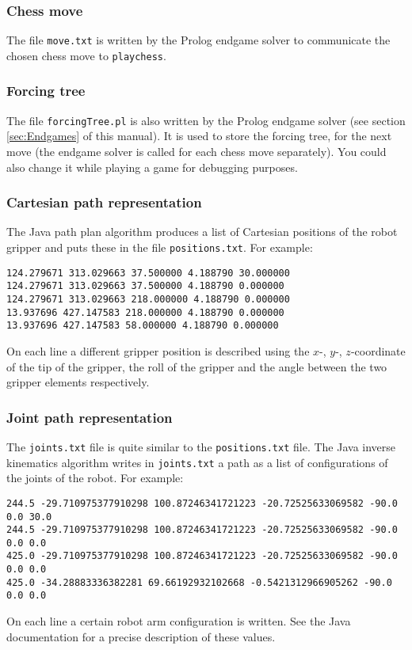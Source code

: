 \documentclass[10pt]{scrartcl}
\begin{document}
\subsubsection{Chess move}
The file \verb|move.txt| is written by the Prolog endgame solver to
communicate the chosen chess move to {\tt playchess}.
\subsubsection{Forcing tree}
The file \verb|forcingTree.pl| is also written by the Prolog endgame
solver (see section \ref{sec:Endgames} of this manual). It is used to store the forcing tree, for the next move (the
endgame solver is called for each chess move separately). You could also
change it while playing a game for debugging purposes.

\subsubsection{Cartesian path representation}
The Java path plan algorithm produces a list of Cartesian positions of
the robot gripper and puts these in the file \verb|positions.txt|. For
example: 
\begin{verbatim}
124.279671 313.029663 37.500000 4.188790 30.000000
124.279671 313.029663 37.500000 4.188790 0.000000
124.279671 313.029663 218.000000 4.188790 0.000000
13.937696 427.147583 218.000000 4.188790 0.000000
13.937696 427.147583 58.000000 4.188790 0.000000
\end{verbatim}
On each line a different gripper position is described using the
$x$-, $y$-, $z$-coordinate of the tip of the gripper, the roll of the
gripper and the angle between the two gripper elements respectively.

\subsubsection{Joint path representation}
The \verb|joints.txt| file is quite similar to the \verb|positions.txt|
file. The Java inverse kinematics algorithm writes in \verb|joints.txt|
a path as a list of configurations of the joints of the robot. For
example:
\begin{verbatim}
244.5 -29.710975377910298 100.87246341721223 -20.72525633069582 -90.0 0.0 30.0
244.5 -29.710975377910298 100.87246341721223 -20.72525633069582 -90.0 0.0 0.0
425.0 -29.710975377910298 100.87246341721223 -20.72525633069582 -90.0 0.0 0.0
425.0 -34.28883336382281 69.66192932102668 -0.5421312966905262 -90.0 0.0 0.0
\end{verbatim}
On each line a certain robot arm configuration is written. See the Java
documentation for a precise description of these values.
\end{document}
